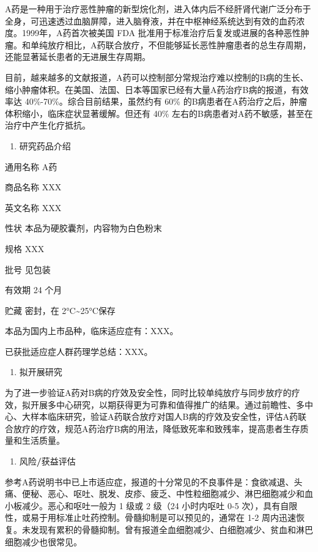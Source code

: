 \documentclass[
  chinese-hans,
  letterpaper,
  DIV=11,
  numbers=noendperiod]{scrreprt}
\providecommand{\tightlist}{%
  \setlength{\itemsep}{0pt}\setlength{\parskip}{0pt}}
\begin{document}
A药是一种用于治疗恶性肿瘤的新型烷化剂，进入体内后不经肝肾代谢广泛分布于全身，可迅速透过血脑屏障，进入脑脊液，并在中枢神经系统达到有效的血药浓度。1999年，A药首次被美国
FDA
批准用于标准治疗后复发或进展的各种恶性肿瘤。和单纯放疗相比，A药联合放疗，不但能够延长恶性肿瘤患者的总生存周期，还能显著延长患者的无进展生存周期。

目前，越来越多的文献报道，A药可以控制部分常规治疗难以控制的B病的生长、缩小肿瘤体积。在美国、法国、日本等国家已经有大量A药治疗B病的报道，有效率达
40\%-70\%。综合目前结果，虽然约有 60\%
的B病患者在A药治疗之后，肿瘤体积缩小，临床症状显著缓解。但还有 40\%
左右的B病患者对A药不敏感，甚至在治疗中产生化疗抵抗。

\begin{enumerate}
\def\labelenumi{\arabic{enumi}.}
\setcounter{enumi}{3}
\tightlist
\item
  研究药品介绍
\end{enumerate}

通用名称 A药

商品名称 XXX

英文名称 XXX

性状 本品为硬胶囊剂，内容物为白色粉末

规格 XXX

批号 见包装

有效期 24 个月

贮藏 密封，在 2°C\textasciitilde25°C保存

本品为国内上市品种，临床适应症有：XXX。

已获批适应症人群药理学总结：XXX。

\begin{enumerate}
\def\labelenumi{\arabic{enumi}.}
\setcounter{enumi}{4}
\tightlist
\item
  拟开展研究
\end{enumerate}

为了进一步验证A药对B病的疗效及安全性，同时比较单纯放疗与同步放疗的疗效，拟开展多中心研究，以期获得更为可靠和值得推广的结果。通过前瞻性、多中心、大样本临床研究，验证A药联合放疗对国人B病的疗效及安全性，评估A药联合放疗的疗效，规范A药治疗B病的用法，降低致死率和致残率，提高患者生存质量和生活质量。

\begin{enumerate}
\def\labelenumi{\arabic{enumi}.}
\setcounter{enumi}{5}
\tightlist
\item
  风险\textbf{/}获益评估
\end{enumerate}

参考A药说明书中已上市适应症，报道的十分常见的不良事件是：食欲减退、头痛、便秘、恶心、呕吐、脱发、皮疹、疲乏、中性粒细胞减少、淋巴细胞减少和血小板减少。恶心和呕吐一般为
1 级或 2 级（24 小时内呕吐 0-5
次），具有自限性，或易于用标准止吐药控制。骨髓抑制是可以预见的，通常在
1-2
周内迅速恢复。未发现有累积的骨髓抑制。曾有报道全血细胞减少、白细胞减少、贫血和淋巴细胞减少也很常见。
\end{document}

